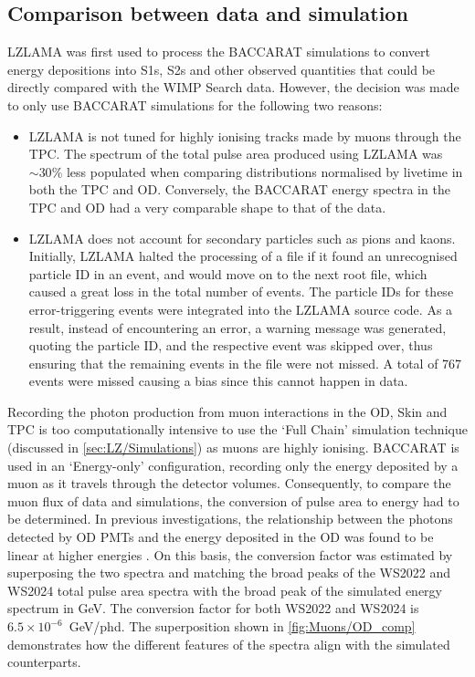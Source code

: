 \subsection{Comparison between data and simulation}\label{sec:Muons/MuonFluxDataSimComp}
LZLAMA was first used to process the BACCARAT simulations to convert energy depositions into S1s, S2s and other observed quantities that could be directly compared with the WIMP Search data. However, the decision was made to only use BACCARAT simulations for the following two reasons:
\begin{itemize}
    \item LZLAMA is not tuned for highly ionising tracks made by muons through the TPC. The spectrum of the total pulse area produced using LZLAMA was $\sim30\%$ less populated when comparing distributions normalised by livetime in both the TPC and OD. Conversely, the BACCARAT energy spectra in the TPC and OD had a very comparable shape to that of the data.
    \item LZLAMA does not account for secondary particles such as pions and kaons. Initially, LZLAMA halted the processing of a file if it found an unrecognised particle ID in an event, and would move on to the next root file, which caused a great loss in the total number of events. The particle IDs for these error-triggering events were integrated into the LZLAMA source code. As a result, instead of encountering an error, a warning message was generated, quoting the particle ID, and the respective event was skipped over, thus ensuring that the remaining events in the file were not missed. A total of 767 events were missed causing a bias since this cannot happen in data. 
\end{itemize}
Recording the photon production from muon interactions in the OD, Skin and TPC is too computationally intensive to use the `Full Chain' simulation technique (discussed in \autoref{sec:LZ/Simulations}) as muons are highly ionising. BACCARAT is used in an `Energy-only' configuration, recording only the energy deposited by a muon as it travels through the detector volumes. Consequently, to compare the muon flux of data and simulations, the conversion of pulse area to energy had to be determined. In previous investigations, the relationship between the photons detected by OD PMTs and the energy deposited in the OD was found to be linear at higher energies \cite{OD_linear}. On this basis, the conversion factor was estimated by superposing the two spectra and matching the broad peaks of the WS2022 and WS2024 total pulse area spectra with the broad peak of the simulated energy spectrum in GeV. The conversion factor for both WS2022 and WS2024 is $6.5\times10^{-6}$~GeV/phd. The superposition shown in \autoref{fig:Muons/OD_comp} demonstrates how the different features of the spectra align with the simulated counterparts.

